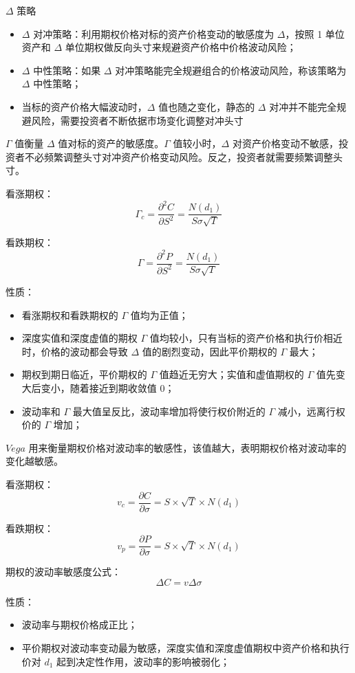 \documentclass{article}
\begin{document}
$\Delta$ 策略
\begin{itemize}
    \item $\Delta$ 对冲策略：利用期权价格对标的资产价格变动的敏感度为 $\Delta$，按照 1 单位资产和 $\Delta$ 单位期权做反向头寸来规避资产价格中价格波动风险；
    \item $\Delta$ 中性策略：如果 $\Delta$ 对冲策略能完全规避组合的价格波动风险，称该策略为 $\Delta$ 中性策略；
    \item 当标的资产价格大幅波动时，$\Delta$ 值也随之变化，静态的 $\Delta$ 对冲并不能完全规避风险，需要投资者不断依据市场变化调整对冲头寸
\end{itemize}

$\Gamma$ 值衡量 $\Delta$ 值对标的资产的敏感度。$\Gamma$ 值较小时，$\Delta$ 对资产价格变动不敏感，投资者不必频繁调整头寸对冲资产价格变动风险。反之，投资者就需要频繁调整头寸。

看涨期权：
$$\Gamma_c=\frac{\partial^2 C}{\partial S^2}=\frac{N(d_1)}{S\sigma\sqrt{T}}$$

看跌期权：
$$\Gamma=\frac{\partial^2 P}{\partial S^2}=\frac{N(d_1)}{S\sigma\sqrt{T}}$$

性质：
\begin{itemize}
    \item 看涨期权和看跌期权的 $\Gamma$ 值均为正值；
    \item 深度实值和深度虚值的期权 $\Gamma$ 值均较小，只有当标的资产价格和执行价相近时，价格的波动都会导致 $\Delta$ 值的剧烈变动，因此平价期权的 $\Gamma$ 最大；
    \item 期权到期日临近，平价期权的 $\Gamma$ 值趋近无穷大；实值和虚值期权的 $\Gamma$ 值先变大后变小，随着接近到期收敛值 0；
    \item 波动率和 $\Gamma$ 最大值呈反比，波动率增加将使行权价附近的 $\Gamma$ 减小，远离行权价的 $\Gamma$ 增加；
\end{itemize}

$Vega$ 用来衡量期权价格对波动率的敏感性，该值越大，表明期权价格对波动率的变化越敏感。

看涨期权：
$$v_c=\frac{\partial C}{\partial \sigma}=S\times \sqrt{T}\times N(d_1)$$

看跌期权：
$$v_p=\frac{\partial P}{\partial \sigma}=S\times \sqrt{T}\times N(d_1)$$

期权的波动率敏感度公式：
$$\Delta C=v\Delta \sigma$$

性质：
\begin{itemize}
    \item 波动率与期权价格成正比；
    \item 平价期权对波动率变动最为敏感，深度实值和深度虚值期权中资产价格和执行价对 $d_1$ 起到决定性作用，波动率的影响被弱化；
\end{itemize}
\end{document}
